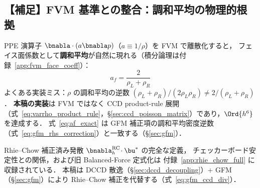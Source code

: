 %
%
\subsection{【補足】FVM 基準との整合：調和平均の物理的根拠}
\label{sec:fvm_face_coeff}

PPE 演算子 $\bnabla\cdot(a\bnabla p)$（$a \equiv 1/\rho$）を FVM で離散化すると，
フェイス面係数として\textbf{調和平均}が自然に現れる（積分論理は付録~\ref{app:fvm_face_coeff}）：
\begin{equation}
  a_f = \frac{2}{\rho_L + \rho_R}
  \label{eq:af_exact}
\end{equation}
よくある実装ミス：$\rho$ の調和平均の逆数 $(\rho_L+\rho_R)/(2\rho_L\rho_R) \neq 2/(\rho_L+\rho_R)$．
\textbf{本稿の実装}は FVM ではなく CCD product-rule 展開（式~\eqref{eq:varrho_product_rule}，§\ref{sec:ccd_poisson_matrix}）であり，$\Ord{h^6}$ を達成する．
式~\eqref{eq:af_exact} は GFM 補正項の調和平均密度逆数（式~\eqref{eq:gfm_rhs_correction}）と一致する（§\ref{sec:gfm}）．

Rhie--Chow 補正済み発散 $\bnabla_h^{\mathrm{RC}}\!\cdot\bu^*$ の完全な定義，
チェッカーボード安定性との関係，および旧 Balanced-Force 定式化は
付録~\ref{app:rhie_chow_full} に収録されている．
本稿は DCCD 散逸（§\ref{sec:dccd_decoupling}）+ GFM（§\ref{sec:gfm}）により
Rhie--Chow 補正を代替する（式~\eqref{eq:gfm_ccd_div}）．
